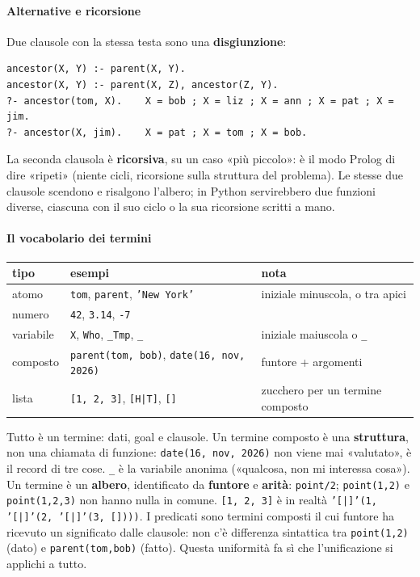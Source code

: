 \documentclass[a4paper,12pt]{article}
\begin{document}
\paragraph{Alternative e ricorsione} Due clausole con la stessa testa sono una
\textbf{disgiunzione}:
\begin{verbatim}
ancestor(X, Y) :- parent(X, Y).
ancestor(X, Y) :- parent(X, Z), ancestor(Z, Y).
?- ancestor(tom, X).    X = bob ; X = liz ; X = ann ; X = pat ; X = jim.
?- ancestor(X, jim).    X = pat ; X = tom ; X = bob.
\end{verbatim}
La seconda clausola è \textbf{ricorsiva}, su un caso «più piccolo»: è il modo Prolog di dire
«ripeti» (niente cicli, ricorsione sulla struttura del problema). Le stesse due clausole
scendono e risalgono l'albero; in Python servirebbero due funzioni diverse, ciascuna con il suo
ciclo o la sua ricorsione scritti a mano.

\paragraph{Il vocabolario dei termini}
\begin{center}
\begin{tabular}{|l|l|l|}
\hline
\textbf{tipo} & \textbf{esempi} & \textbf{nota} \\
\hline
atomo & \texttt{tom}, \texttt{parent}, \texttt{'New York'} & iniziale minuscola, o tra apici \\
numero & \texttt{42}, \texttt{3.14}, \texttt{-7} & \\
variabile & \texttt{X}, \texttt{Who}, \texttt{\_Tmp}, \texttt{\_} & iniziale maiuscola o \texttt{\_} \\
composto & \texttt{parent(tom, bob)}, \texttt{date(16, nov, 2026)} & funtore + argomenti \\
lista & \texttt{[1, 2, 3]}, \texttt{[H|T]}, \texttt{[]} & zucchero per un termine composto \\
\hline
\end{tabular}
\end{center}
Tutto è un termine: dati, goal e clausole. Un termine composto è una \textbf{struttura}, non una
chiamata di funzione: \texttt{date(16, nov, 2026)} non viene mai «valutato», è il record di tre
cose. \texttt{\_} è la variabile anonima («qualcosa, non mi interessa cosa»). Un termine è un
\textbf{albero}, identificato da \textbf{funtore} e \textbf{arità}: \texttt{point/2};
\texttt{point(1,2)} e \texttt{point(1,2,3)} non hanno nulla in comune. \texttt{[1, 2, 3]} è in
realtà \texttt{'[|]'(1, '[|]'(2, '[|]'(3, [])))}. I predicati sono termini composti il cui funtore
ha ricevuto un significato dalle clausole: non c'è differenza sintattica tra
\texttt{point(1,2)} (dato) e \texttt{parent(tom,bob)} (fatto). Questa uniformità fa sì che
l'unificazione si applichi a tutto.
\end{document}
